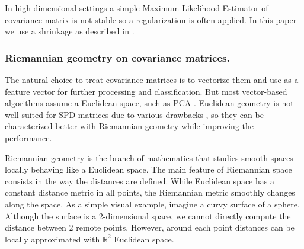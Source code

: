 \documentclass[12pt]{iopart}
\begin{document}
In high dimensional settings a simple Maximum Likelihood Estimator of covariance matrix is not
stable so a regularization is often applied. In this paper we use
a shrinkage as described in \cite{chen_shrinkage_2010}.

\subsubsection{Riemannian geometry on covariance matrices.}
The natural choice to treat covariance matrices is to vectorize them
and use as a feature vector for further processing and classification.
But most vector-based algorithms assume a Euclidean space, such as PCA \cite{hyvarinen_independent_2001}.
Euclidean geometry is not well suited for SPD matrices due to various
drawbacks \cite{arsigny_geometric_2007}, so they can be characterized 
better with Riemannian geometry while improving the performance.

Riemannian geometry is the branch of mathematics that studies
smooth spaces locally behaving like a Euclidean space.
The main feature of Riemannian space consists in the way the distances are defined.
While Euclidean space has a constant distance metric in all points,
the Riemannian metric smoothly changes along the space.
As a simple visual example, imagine a curvy surface of a sphere.
Although the surface is a 2-dimensional space,
we cannot directly compute the distance between 2 remote points.
However, around each point distances can be locally approximated
with $\mathbb{R}^2$ Euclidean space.
\end{document}
